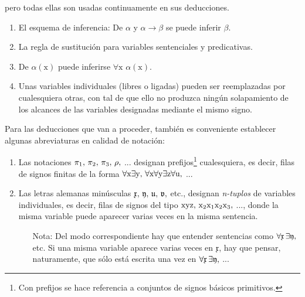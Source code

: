 \begin{itemize}
{            pero todas ellas son usadas continuamente en sus deducciones.}
            \begin{enumerate}
                \item El esquema de inferencia: De $\alpha$ y $\alpha \rightarrow \beta$ se puede inferir $\beta$.
                \item La regla de sustitución para variables sentenciales y predicativas.
                \item De $\alpha(\text{x})$ puede inferirse $\forall \text{x } \alpha(\text{x})$.
                \item Unas variables individuales (libres o ligadas) pueden ser reemplazadas por cualesquiera otras, con tal de que 
                        ello no produzca ningún solapamiento de los alcances de las variables designadas mediante el mismo signo.
            \end{enumerate}
\end{itemize}

Para las deducciones que van a proceder, también es conveniente establecer algunas abreviaturas en calidad de notación:

\begin{enumerate}
    \item Las notaciones $\pi_1, \thinspace \pi_2, \thinspace \pi_3, \thinspace \rho, $ ... designan prefijos\footnote{Con prefijos 
    se hace referencia a conjuntos de signos básicos primitivos.} cualesquiera, es decir, filas de signos
            finitas de la forma $\forall \text{x} \exists \text{y}, \thinspace \forall \text{x} \forall \text{y} \exists \text{z} \forall \text{u},$ ...
    \item Las letras alemanas minúsculas $\mathfrak{x, \thinspace y, \thinspace u, \thinspace v,} $ etc., designan \textit{n-tuplos} de variables
            individuales, es decir, filas de signos del tipo $\text{xyz}, \thinspace \text{x}_2\text{x}_1\text{x}_2\text{x}_3,$ ..., 
            donde la misma variable puede aparecer varias veces en la misma sentencia.
            \begin{itemize}
                \item[Nota:] Del modo correspondiente hay que entender sentencias como $\forall \mathfrak{x} \thinspace \exists \mathfrak{y},$ etc. 
                            Si una misma variable aparece varias veces en $\mathfrak{x}$, hay que pensar, naturamente, que sólo está escrita una vez
                            en $\forall \mathfrak{x} \thinspace \exists \mathfrak{y},$ ...
            \end{itemize}
\end{enumerate}

